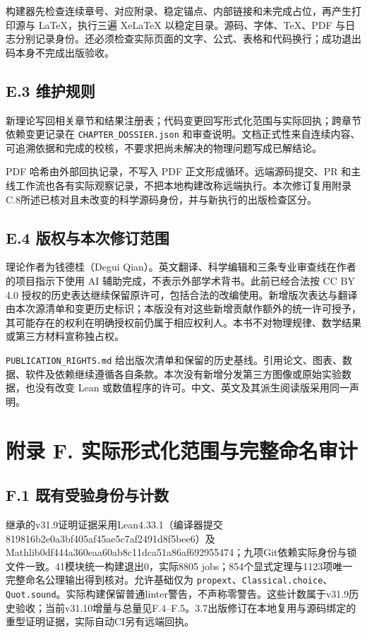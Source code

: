 \documentclass[
  11pt,
  oneside]{book}
\begin{document}
构建器先检查连续章号、对应附录、稳定锚点、内部链接和未完成占位，再产生打印源与
LaTeX，执行三遍 XeLaTeX 以稳定目录。源码、字体、TeX、PDF
与日志分别记录身份。还必须检查实际页面的文字、公式、表格和代码换行；成功退出码本身不完成出版验收。

\section{E.3 维护规则}

新理论写回相关章节和结果注册表；代码变更回写形式化范围与实际回执；跨章节依赖变更记录在
\texttt{CHAPTER\_\allowbreak DOSSIER.\allowbreak json}
和审查说明。文档正式性来自连续内容、可追溯依据和完成的校核，不要求把尚未解决的物理问题写成已解结论。

PDF 哈希由外部回执记录，不写入 PDF 正文形成循环。远端源码提交、PR
和主线工作流也各有实际观察记录，不把本地构建改称远端执行。本次修订复用附录C.8所述已核对且未改变的科学源码身份，并与新执行的出版检查区分。

\section{E.4 版权与本次修订范围}

理论作者为钱德桂（Degui
Qian）。英文翻译、科学编辑和三条专业审查线在作者的项目指示下使用 AI
辅助完成，不表示外部学术背书。此前已经合法按 CC BY 4.0
授权的历史表达继续保留原许可，包括合法的改编使用。新增版次表达与翻译由本次源清单和变更历史标识；本版没有对这些新增贡献作额外的统一许可授予，其可能存在的权利在明确授权前仍属于相应权利人。本书不对物理规律、数学结果或第三方材料宣称独占权。

\texttt{PUBLICATION\_\allowbreak RIGHTS.\allowbreak md}
给出版次清单和保留的历史基线。引用论文、图表、数据、软件及依赖继续遵循各自条款。本次没有新增分发第三方图像或原始实验数据，也没有改变
Lean 或数值程序的许可。中文、英文及其派生阅读版采用同一声明。

\chapter{附录 F. 实际形式化范围与完整命名审计}\label{appendix-f}\hypertarget{appendix-f}{}

\section{F.1 既有受验身份与计数}

继承的v31.9证明证据采用Lean4.33.1（编译器提交819816b2e0a3bf40\allowbreak 5af45ae5c7af2491\allowbreak d8f5bee6）及Mathlib0df444a360eaa60ab8c11dca51a86af692955474；九项Git依赖实际身份与锁文件一致。41模块统一构建退出0，实际8805
jobs；854个显式定理与1123项唯一完整命名公理输出得到核对。允许基础仅为
\texttt{propext}、\allowbreak \texttt{Classical.\allowbreak choice}、\allowbreak \texttt{Quot.\allowbreak sound}。实际构建保留普通linter警告，不声称零警告。这些计数属于v31.9历史验收；当前v31.10增量与总量见F.4--F.5。3.7出版修订在本地复用与源码绑定的重型证明证据，实际自动CI另有远端回执。
\end{document}
